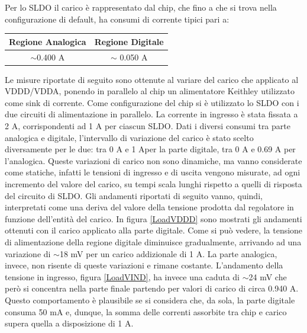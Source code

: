 Per lo SLDO il carico è rappresentato dal chip, che fino a che si trova nella configurazione di default, ha consumi di corrente tipici pari a:
\begin{center}
\begin{tabular}{cc}
\hline
Regione Analogica & Regione Digitale \\ \hline
$\sim$0.400 A & $\sim$ 0.050 A\\ \hline     
\end{tabular}
\end{center}
Le misure riportate di seguito sono ottenute al variare del carico che applicato al VDDD/VDDA, ponendo in parallelo al chip un alimentatore Keithley utilizzato come sink di corrente. 
Come configurazione del chip si è utilizzato lo SLDO con i due circuiti di alimentazione in parallelo. 
La corrente in ingresso è stata fissata a 2 A, corrispondenti ad 1 A per ciascun SLDO. 
Dati i diversi consumi tra parte analogica e digitale, l'intervallo di variazione del carico è stato scelto diversamente per le due: tra 0 A e 1 Aper la parte digitale, tra 0 A e 0.69 A per l'analogica. 
Queste variazioni di carico non sono dinamiche, ma vanno considerate come statiche, infatti le tensioni di ingresso e di uscita vengono misurate, ad ogni incremento del valore del carico, su tempi scala lunghi rispetto a quelli di risposta del circuito di SLDO. 
Gli andamenti riportati di seguito vanno, quindi, interpretati come una deriva del valore della tensione prodotta dal regolatore in funzione dell'entità del carico. 
In figura \ref{LoadVDDD} sono mostrati gli andamenti ottenuti con il carico applicato alla parte digitale.
Come si può vedere, la tensione di alimentazione della regione digitale diminuisce gradualmente, arrivando ad una variazione di $\sim$18 mV per un carico addizionale di 1 A.
La parte analogica, invece, non risente di queste variazioni e rimane costante. %
L'andamento della tensione in ingresso, figura \ref{LoadVIND}, ha invece una caduta di $\sim$24 mV che però si concentra nella parte finale partendo per valori di carico di circa 0.940 A.
Questo comportamento è plausibile se si considera che, da sola, la parte digitale consuma 50 mA e, dunque, la somma delle correnti assorbite tra chip e carico supera  quella a disposizione di 1 A. 
